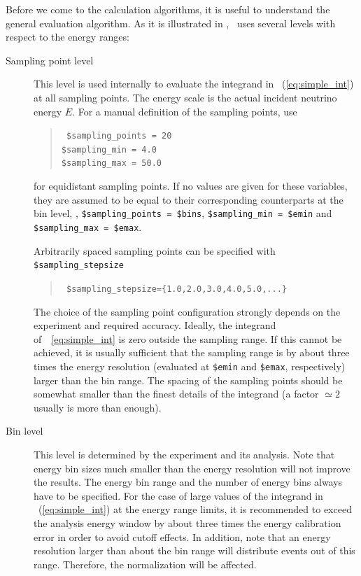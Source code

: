 Before we come to the calculation algorithms, it is useful to understand
the general evaluation algorithm. As it is illustrated in , 
\GLOBES\ uses several levels with respect to the energy ranges:
\begin{description}
\item[Sampling point level]
 This level is used internally to evaluate the integrand in \eq~(\ref{eq:simple_int}) at all sampling points. The energy scale is the actual incident neutrino energy $E$. 
For a manual definition of the sampling points, use
\begin{quote}
{\tt
\$sampling\_points = 20\\
\$sampling\_min =          4.0\\
\$sampling\_max =         50.0
}
\end{quote}
for equidistant sampling points. If no values are given for these variables,
they are assumed to be equal to their corresponding counterparts at the bin level,
\ie , \verb+$sampling_points = $bins+, \verb+$sampling_min = $emin+ and
\verb+$sampling_max = $emax+.


Arbitrarily spaced sampling points can 
be specified with 
{\tt \$sampling\_stepsize}
\begin{quote}
{\tt
\$sampling\_stepsize=\{1.0,2.0,3.0,4.0,5.0,...\}
}
\end{quote}
The choice of the sampling point configuration strongly depends on the 
experiment and required accuracy. Ideally, the integrand 
of~\eq~\ref{eq:simple_int} is zero outside the sampling range. If this cannot
be achieved, it is usually sufficient that the sampling range is by about
three times the energy resolution (evaluated at {\tt \$emin} and
{\tt \$emax}, respectively) larger than the bin range. 
The spacing of the sampling points should be somewhat smaller than the 
finest details of the integrand (a factor 
$\simeq 2$ usually is more than enough).



\item[Bin level] This level is determined by the experiment and its analysis. 
Note that energy
bin sizes much smaller than the energy resolution will not improve the results. The energy bin range and the number of energy bins always have to be specified. For the case of large values of the integrand in \eq~(\ref{eq:simple_int}) at the energy range limits, it is recommended to exceed the analysis energy window by about three times the energy calibration error in order 
to avoid cutoff effects. In addition, note that an energy resolution larger than about the
bin range will distribute events out of this range. Therefore, the normalization
will be affected.


\end{description}
